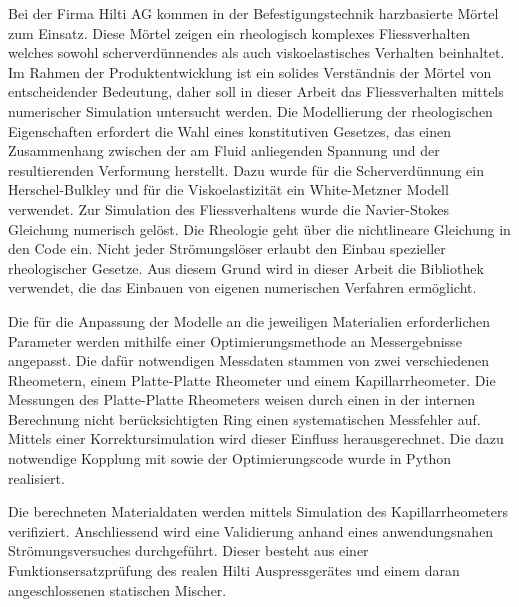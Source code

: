 \thispagestyle{empty}
\begin{abstr}
Bei der Firma Hilti AG kommen in der Befestigungstechnik harzbasierte Mörtel zum Einsatz.
Diese Mörtel zeigen ein rheologisch komplexes Fliessverhalten welches sowohl scherverdünnendes als auch viskoelastisches Verhalten beinhaltet. Im Rahmen der Produktentwicklung ist ein solides Verständnis der Mörtel von entscheidender Bedeutung, daher soll in dieser Arbeit das Fliessverhalten mittels numerischer Simulation untersucht werden.
Die Modellierung der rheologischen Eigenschaften erfordert die Wahl eines konstitutiven Gesetzes, das einen Zusammenhang zwischen der am Fluid anliegenden Spannung und der resultierenden Verformung herstellt. Dazu wurde für die Scherverdünnung ein Herschel-Bulkley und für die Viskoelastizität ein White-Metzner Modell verwendet.
Zur Simulation des Fliessverhaltens wurde die Navier-Stokes Gleichung numerisch gelöst. Die Rheologie geht über die nichtlineare Gleichung in den Code ein. Nicht jeder Strömungslöser erlaubt den Einbau spezieller rheologischer Gesetze.
Aus diesem Grund wird in dieser Arbeit die Bibliothek \openfoam{} verwendet, die das Einbauen von eigenen numerischen Verfahren ermöglicht.

Die für die Anpassung der Modelle an die jeweiligen Materialien erforderlichen Parameter werden mithilfe einer Optimierungsmethode an Messergebnisse angepasst. Die dafür notwendigen Messdaten stammen von zwei verschiedenen Rheometern, einem Platte-Platte Rheometer und einem Kapillarrheometer. Die Messungen des Platte-Platte Rheometers weisen durch einen in der internen Berechnung nicht berücksichtigten Ring einen systematischen Messfehler auf. Mittels einer Korrektursimulation wird dieser Einfluss herausgerechnet. Die dazu notwendige Kopplung mit \openfoam{} sowie der Optimierungscode wurde in Python realisiert.

Die berechneten Materialdaten werden mittels Simulation des Kapillarrheometers verifiziert. Anschliessend wird eine Validierung anhand eines anwendungsnahen Strömungsversuches durchgeführt. Dieser besteht aus einer Funktionsersatzprüfung des realen Hilti Auspressgerätes und einem daran angeschlossenen statischen Mischer.
\end{abstr}
%
\newpage
{}
%
